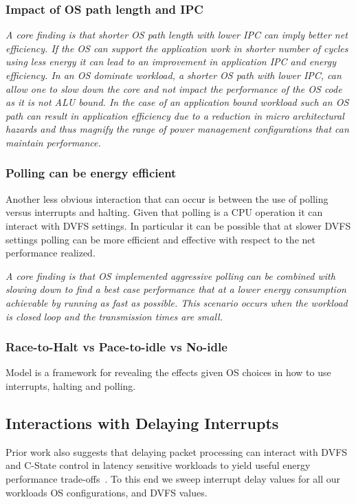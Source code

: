 \subsubsection{Impact of OS path length and IPC}
{\em A core finding is that  shorter OS path length with lower IPC can imply better net efficiency.  If the OS can support the application work in shorter number of cycles using less energy it can lead to an improvement in application IPC and energy efficiency.  In an OS dominate workload, a shorter OS path with lower IPC, can allow one to slow down the core and not impact the performance of the OS code as it is not ALU bound. In the case of an application bound workload such an OS path can result in application efficiency due to a reduction in micro architectural hazards and thus magnify the range of power management configurations that can maintain performance. }   
 

\subsubsection{Polling can be energy efficient}
Another less obvious interaction that can occur is between the use of polling versus interrupts and halting.  Given that polling is a CPU operation it can interact with DVFS settings.  In particular it can be possible that at slower DVFS settings polling can be more efficient and effective with respect to the net performance realized.  

{\em A core finding is that OS implemented aggressive polling can be combined with slowing down to find a best case performance that at a lower energy consumption  achievable by running as fast as possible.  This scenario occurs when the workload is closed loop and the transmission times are small. }

\subsubsection{Race-to-Halt vs Pace-to-idle vs No-idle}

Model is a framework for revealing the effects given OS choices in how to use interrupts, halting and polling.  

\subsection{Interactions with Delaying Interrupts}

Prior work also suggests that delaying packet processing can interact with DVFS and C-State control in latency sensitive workloads to yield useful energy performance trade-offs~\cite{mootaz, chou}. To this end we sweep interrupt delay values for all our workloads OS configurations, and DVFS values.


